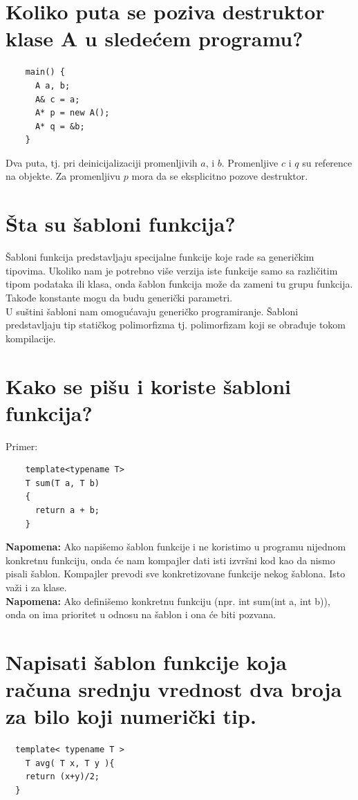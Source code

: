 \documentclass[a4paper]{article}
\begin{document}
\section{Koliko puta se poziva destruktor klase A u sledećem programu?}
    \begin{lstlisting}
    main() {
      A a, b;
      A& c = a;
      A* p = new A();
      A* q = &b;
    }\end{lstlisting}

    Dva puta, tj. pri deinicijalizaciji promenljivih $a$, i $b$. Promenljive $c$ i $q$ su reference 
    na objekte. Za promenljivu $p$ mora da se eksplicitno pozove destruktor.

\section{Šta su šabloni funkcija?}
    Šabloni funkcija predstavljaju specijalne funkcije koje rade sa generičkim tipovima. 
    Ukoliko nam je potrebno više verzija iste funkcije samo sa različitim tipom podataka ili klasa, 
    onda šablon funkcija može da zameni tu grupu funkcija. Takođe konstante mogu da budu generički 
    parametri. \\
    \indent U suštini šabloni nam omogućavaju generičko programiranje. Šabloni predstavljaju tip 
    statičkog polimorfizma tj. polimorfizam koji se obrađuje tokom kompilacije.\cite{cppref_templates}

\section{Kako se pišu i koriste šabloni funkcija?}
  \noindent Primer:
  \begin{lstlisting}
    template<typename T> 
    T sum(T a, T b)
    {
      return a + b;
    }\end{lstlisting}
  \textbf{Napomena:} Ako napišemo šablon funkcije i ne koristimo u programu nijednom konkretnu funkciju,
  onda će nam kompajler dati isti izvršni kod kao da nismo pisali šablon. Kompajler prevodi 
  sve konkretizovane funkcije nekog šablona. Isto važi i za klase. \\
  \textbf{Napomena:} Ako definišemo konkretnu funkciju (npr. int sum(int a, int b)), onda on ima 
  prioritet u odnosu na šablon i ona će biti pozvana.

\section{Napisati šablon funkcije koja računa srednju vrednost dva broja za bilo koji numerički tip.}
\begin{lstlisting}
  template< typename T >
    T avg( T x, T y ){
    return (x+y)/2;
  }\end{lstlisting}
\end{document}
